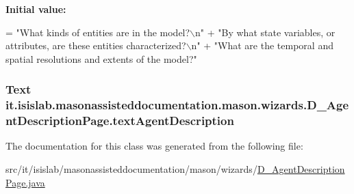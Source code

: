 {\bfseries Initial value\-:}
\begin{DoxyCode}
= \textcolor{stringliteral}{"What kinds of entities are in the model?\(\backslash\)n"}
                                          + \textcolor{stringliteral}{"By what state variables, or attributes, are these entities
       characterized?\(\backslash\)n"}
                                          + \textcolor{stringliteral}{"What are the temporal and spatial resolutions and extents of
       the model?"}
\end{DoxyCode}
\hypertarget{classit_1_1isislab_1_1masonassisteddocumentation_1_1mason_1_1wizards_1_1_d___agent_description_page_a36dfef5219d3c9d56facf7345020ee82}{
\subsubsection[{text\-Agent\-Description}]{\setlength{\rightskip}{0pt plus 5cm}Text it.\-isislab.\-masonassisteddocumentation.\-mason.\-wizards.\-D\-\_\-\-Agent\-Description\-Page.\-text\-Agent\-Description\hspace{0.3cm}{\ttfamily [private]}}}\label{classit_1_1isislab_1_1masonassisteddocumentation_1_1mason_1_1wizards_1_1_d___agent_description_page_a36dfef5219d3c9d56facf7345020ee82}


The documentation for this class was generated from the following file\-:\begin{DoxyCompactItemize}
\item 
src/it/isislab/masonassisteddocumentation/mason/wizards/\hyperlink{_d___agent_description_page_8java}{D\-\_\-\-Agent\-Description\-Page.\-java}\end{DoxyCompactItemize}
